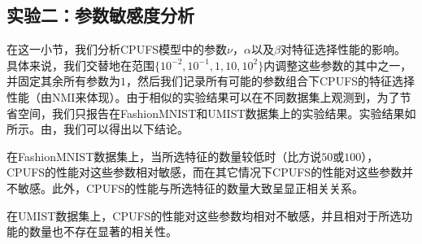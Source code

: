 \subsection{实验二：参数敏感度分析}
在这一小节，我们分析CPUFS模型中的参数$\nu$，$\alpha$以及$\beta$对特征选择性能的影响。具体来说，我们交替地在范围$\{10^{-2},10^{-1},1,10,10^{2}\}$内调整这些参数的其中之一，并固定其余所有参数为$1$，然后我们记录所有可能的参数组合下CPUFS的特征选择性能（由NMI来体现）。由于相似的实验结果可以在不同数据集上观测到，为了节省空间，我们只报告在FashionMNIST和UMIST数据集上的实验结果。实验结果如所示。由，我们可以得出以下结论。
\begin{enumerate*}
\item 在FashionMNIST数据集上，当所选特征的数量较低时（比方说$50$或$100$），CPUFS的性能对这些参数相对敏感，而在其它情况下CPUFS的性能对这些参数并不敏感。此外，CPUFS的性能与所选特征的数量大致呈显正相关关系。
\item 在UMIST数据集上，CPUFS的性能对这些参数均相对不敏感，并且相对于所选功能的数量也不存在显著的相关性。
\end{enumerate*}

